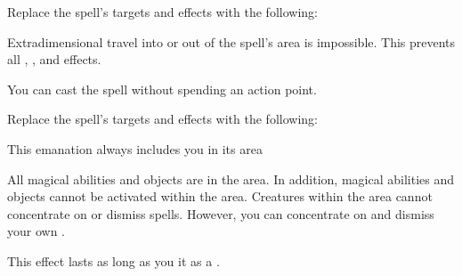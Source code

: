 


Replace the spell's targets and effects with the following:
\begin{spellcontent}

\begin{augmenttargetinginfo}




\end{augmenttargetinginfo}


\begin{augmenteffects}



\spelleffect
Extradimensional travel into or out of the spell's area is impossible.
This prevents all , , and  effects.








\end{augmenteffects}

\end{spellcontent}





You can cast the spell without spending an action point.








Replace the spell's targets and effects with the following:
\begin{spellcontent}

\begin{augmenttargetinginfo}
\spellspecial This emanation always includes you in its area



\end{augmenttargetinginfo}


\begin{augmenteffects}



\spelleffect
All magical abilities and objects are  in the area.
In addition, magical abilities and objects cannot be activated within the area.
Creatures within the area cannot concentrate on or dismiss spells.
However, you can concentrate on and dismiss your own .

This effect lasts as long as you  it as a .








\end{augmenteffects}

\end{spellcontent}




